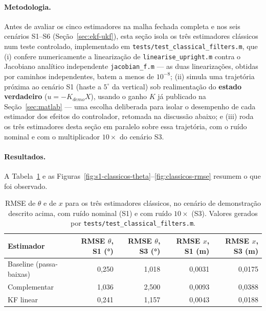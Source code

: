\documentclass[brazil, 12pt]{article}
\begin{document}
\paragraph{Metodologia.} Antes de avaliar os cinco estimadores na malha
fechada completa e nos seis cenários S1--S6 (Seção~\ref{sec:ekf-ukf}), esta
seção isola os três estimadores clássicos num teste controlado, implementado
em \texttt{tests/test\_classical\_filters.m}, que (i) confere numericamente a
linearização de \texttt{linearise\_upright.m} contra o Jacobiano analítico
independente \texttt{jacobian\_f.m} — as duas linearizações, obtidas por
caminhos independentes, batem a menos de $10^{-8}$; (ii) simula uma
trajetória próxima ao cenário S1 (haste a $5^{\circ}$ da vertical) sob
realimentação do \textbf{estado verdadeiro} ($u=-K_{demo}X$), usando o ganho
$K$ já publicado na Seção~\ref{sec:matlab} — uma escolha deliberada para
isolar o desempenho de cada estimador dos efeitos do controlador, retomada na
discussão abaixo; e (iii) roda os três estimadores desta seção em paralelo
sobre essa trajetória, com o ruído nominal e com o multiplicador $10\times$ do
cenário S3.

\paragraph{Resultados.} A Tabela~\ref{tab:rmse-classicos} e as
Figuras~\ref{fig:s1-classicos-theta}--\ref{fig:classicos-rmse} resumem o que
foi observado.

\begin{table}[H]
\centering
\small
\begin{tabular}{@{}l r r r r@{}}
\hline
\textbf{Estimador} & \textbf{RMSE $\theta$, S1 (°)} & \textbf{RMSE $\theta$, S3 (°)} & \textbf{RMSE $x$, S1 (m)} & \textbf{RMSE $x$, S3 (m)} \\
\hline
Baseline (passa-baixas) & 0,250 & 1,018 & 0,0031 & 0,0175 \\
Complementar             & 1,036 & 2,500 & 0,0093 & 0,0388 \\
KF linear                & 0,241 & 1,157 & 0,0043 & 0,0188 \\
\hline
\end{tabular}
\caption{RMSE de $\theta$ e de $x$ para os três estimadores clássicos, no
cenário de demonstração descrito acima, com ruído nominal (S1) e com
ruído $10\times$ (S3). Valores gerados por
\texttt{tests/test\_classical\_filters.m}.}
\label{tab:rmse-classicos}
\end{table}
\end{document}
